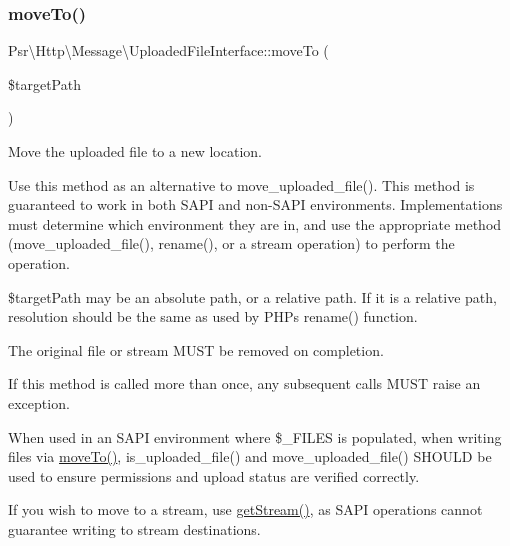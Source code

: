 \mbox{\label{interfacePsr_1_1Http_1_1Message_1_1UploadedFileInterface_aac862c26ca280245c0fb197d0266fdf4}} 
\subsubsection{\texorpdfstring{move\+To()}{moveTo()}}
{\footnotesize\ttfamily Psr\textbackslash{}\+Http\textbackslash{}\+Message\textbackslash{}\+Uploaded\+File\+Interface\+::move\+To (\begin{DoxyParamCaption}\item[{}]{\$target\+Path }\end{DoxyParamCaption})}

Move the uploaded file to a new location.

Use this method as an alternative to move\+\_\+uploaded\+\_\+file(). This method is guaranteed to work in both S\+A\+PI and non-\/\+S\+A\+PI environments. Implementations must determine which environment they are in, and use the appropriate method (move\+\_\+uploaded\+\_\+file(), rename(), or a stream operation) to perform the operation.

\$target\+Path may be an absolute path, or a relative path. If it is a relative path, resolution should be the same as used by P\+HP\textquotesingle{}s rename() function.

The original file or stream M\+U\+ST be removed on completion.

If this method is called more than once, any subsequent calls M\+U\+ST raise an exception.

When used in an S\+A\+PI environment where \$\+\_\+\+F\+I\+L\+ES is populated, when writing files via \hyperlink{interfacePsr_1_1Http_1_1Message_1_1UploadedFileInterface_aac862c26ca280245c0fb197d0266fdf4}{move\+To()}, is\+\_\+uploaded\+\_\+file() and move\+\_\+uploaded\+\_\+file() S\+H\+O\+U\+LD be used to ensure permissions and upload status are verified correctly.

If you wish to move to a stream, use \hyperlink{interfacePsr_1_1Http_1_1Message_1_1UploadedFileInterface_a342c7814f65c2b256dc525bc3063d662}{get\+Stream()}, as S\+A\+PI operations cannot guarantee writing to stream destinations.


